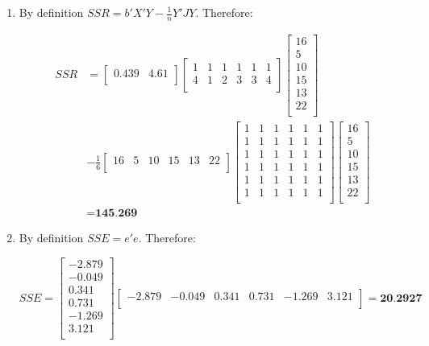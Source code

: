 \documentclass[12pt, letterpaper]{article}
\begin{document}
\begin{enumerate}
\item By definition $SSR = b'X'Y-\frac{1}{n}Y'JY$. Therefore:

\begin{align*}
SSR &= \begin{bmatrix}
0.439 & 4.61 \\ 
\end{bmatrix}
\begin{bmatrix}
1 & 1 & 1 & 1 & 1 & 1 \\
 4 & 1 & 2 & 3 & 3 & 4 \\
\end{bmatrix}
\begin{bmatrix}
 16 \\
 5 \\
 10 \\
 15 \\
 13 \\
 22 \\
\end{bmatrix} \\ &- \frac{1}{6}
\begin{bmatrix}
 16 & 5 & 10 & 15 & 13 & 22 \\
\end{bmatrix}
\begin{bmatrix}
 1 & 1 & 1 & 1 & 1 & 1 \\
 1 & 1 & 1 & 1 & 1 & 1 \\
 1 & 1 & 1 & 1 & 1 & 1 \\
 1 & 1 & 1 & 1 & 1 & 1 \\
 1 & 1 & 1 & 1 & 1 & 1 \\
 1 & 1 & 1 & 1 & 1 & 1 \\
\end{bmatrix}
\begin{bmatrix}
16 \\
 5 \\
 10 \\
 15 \\
 13 \\
 22 \\
\end{bmatrix} \\
&= \textbf{145.269}
\end{align*}

\item By definition $SSE=e'e$. Therefore:

\begin{equation*}
SSE = \begin{bmatrix}
 -2.879 \\
 -0.049 \\
 0.341 \\
 0.731 \\
 -1.269 \\
 3.121 \\
\end{bmatrix} 
\begin{bmatrix}
 -2.879 & -0.049 & 0.341 & 0.731 & -1.269 & 3.121 \\
\end{bmatrix} = \textbf{20.2927}
\end{equation*}


\end{enumerate}
\end{document}
